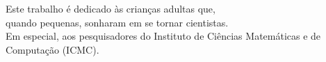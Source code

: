 Este trabalho é dedicado às crianças adultas que,\\
quando pequenas, sonharam em se tornar cientistas. \\
Em especial, aos pesquisadores do Instituto de Ciências Matemáticas e de Computação (ICMC).
